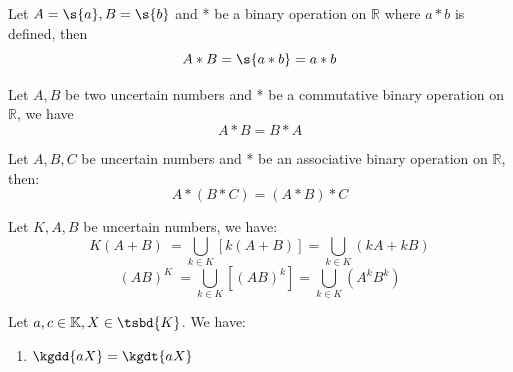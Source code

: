 \begin{theorem}
	Let $A = \s{a} , B = \s{b}$ and * be a binary operation on $\mathbb{R}$ where $a*b$ is defined, then $$A * B = \s{a*b} = a*b$$
\end{theorem}
\begin{theorem}[Commutativity]
	Let $A,B$ be two uncertain numbers and * be a commutative binary operation on $\mathbb{R}$, we have
	$$A*B = B*A$$
\end{theorem}
\begin{theorem}[Associativity]
	Let $A,B,C$ be uncertain numbers and * be an associative binary operation on $\mathbb{R}$, then:
	\[A*(B*C) = (A*B)*C\]
\end{theorem}
\begin{theorem}[Distributivity]
	Let $K,A,B$ be uncertain numbers, we have:
	\[K(A+B)\ = \bigcup_{k \in K} [k(A+B)] = \bigcup_{k \in K} (kA+kB)\]
	\[(AB)^K\ = \bigcup_{k \in K} \left[(AB)^k \right] = \bigcup_{k \in K} \left(A^kB^k\right) \]
\end{theorem}
\begin{theorem}
Let $a,c \in \mathbb{K}, X \in \tsbd{K}$. We have:
\begin{enumerate}
	\item $\kgdd{aX} = \kgdt{aX}$
\end{enumerate}
\end{theorem}
